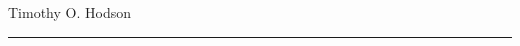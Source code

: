 \documentclass[10pt]{article}
\begin{document}
\begin{cv}{Timothy O. Hodson}
\hrule

\medskip











\end{cv}
\end{document}
